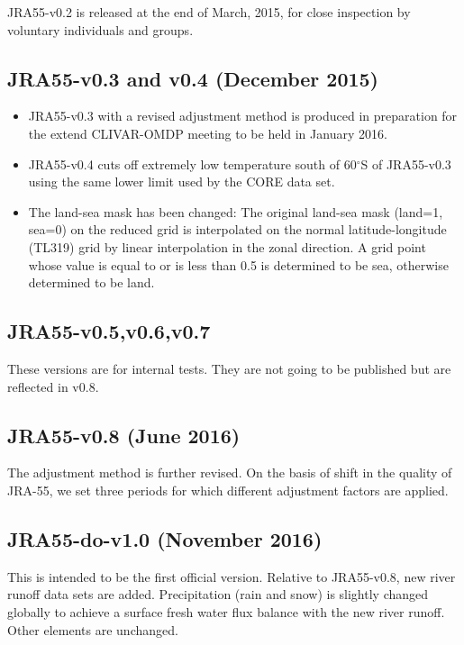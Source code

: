 \documentclass[dvipdfmx]{elsarticle_mod}
\begin{document}
JRA55-v0.2 is released at the end of March, 2015, for close inspection by voluntary individuals and groups.


\subsection{JRA55-v0.3 and v0.4 (December 2015)}

\begin{itemize}
\item JRA55-v0.3 with a revised adjustment method is produced in preparation for the extend CLIVAR-OMDP meeting to be held in January 2016. 
\item JRA55-v0.4 cuts off extremely low temperature south of 60$^{\circ}$S of JRA55-v0.3 using the same lower limit used by the CORE data set.
\item The land-sea mask has been changed: The original land-sea mask (land=1, sea=0) on the reduced grid is interpolated on the normal latitude-longitude (TL319) grid by linear interpolation in the zonal direction. A grid point whose value is equal to or is less than 0.5 is determined to be sea, otherwise determined to be land.
\end{itemize}

\subsection{JRA55-v0.5,v0.6,v0.7}

These versions are for internal tests. They are not going to be published but are reflected in v0.8.

\subsection{JRA55-v0.8 (June 2016)}

The adjustment method is further revised. On the basis of shift in the quality of JRA-55, we set three periods for which different adjustment factors are applied.

\subsection{JRA55-do-v1.0 (November 2016)}

This is intended to be the first official version. Relative to JRA55-v0.8, new river runoff data sets are added. Precipitation (rain and snow) is slightly changed globally to achieve a surface fresh water flux balance with the new river runoff. Other elements are unchanged.
\end{document}
